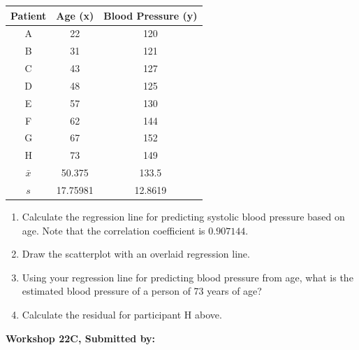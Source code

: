 \documentclass[11pt, chapterprefix=true]{scrbook}\usepackage[]{graphicx}\usepackage[]{color}
\begin{document}
\begin{exercises}
\begin{exercise}
\begin{center}
\begin{tabular}{@{} ccc @{}} \hline
Patient &	Age (x)	& Blood Pressure (y) \\ \hline
A&	22&	120 \\
B&	31&	121 \\
C&	43&	127 \\
D&	48&	125 \\
E&	57&	130 \\
F&	62&	144 \\
G&	67&	152 \\
H&	73&	149 \\ \hline
$\bar{x}$ & 50.375 & 133.5 \\
$s$ & 17.75981 & 12.8619 \\ \hline
\end{tabular}
\end{center}

\begin{enumerate}
  \item Calculate the regression line for predicting systolic blood pressure based on age. Note that the correlation coefficient is $0.907144$.
	\item Draw the scatterplot with an overlaid regression line.
	\item Using your regression line for predicting blood pressure from age, what is the estimated blood pressure of a person of 73 years of age?
  \item Calculate the residual for participant H above.
\end{enumerate}

\end{exercise}
\begin{solution}  %

\end{solution}


\clearpage

    \begin{exercise}  %

    \begin{center}
\begin{flushleft}\textbf{\large \hfill Workshop 22C, Submitted by: }\end{flushleft}

\end{center}
\end{exercise}
\end{exercises}
\end{document}
